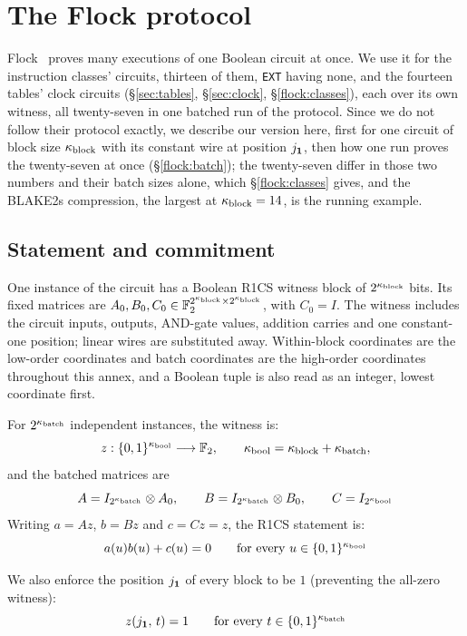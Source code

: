 \section{The Flock protocol}\label{annex:flock}

Flock~\cite{Flock26} proves many executions of one Boolean circuit at once. We use it for the instruction classes' circuits, thirteen of them, \texttt{EXT} having none, and the fourteen tables' clock circuits (\S\ref{sec:tables}, \S\ref{sec:clock}, \S\ref{flock:classes}), each over its own witness, all twenty-seven in one batched run of the protocol. Since we do not follow their protocol exactly, we describe our version here, first for one circuit of block size $\kappa_{\mathrm{block}}$ with its constant wire at position $j_{\mathbf{1}}$, then how one run proves the twenty-seven at once (\S\ref{flock:batch}); the twenty-seven differ in those two numbers and their batch sizes alone, which \S\ref{flock:classes} gives, and the BLAKE2s compression, the largest at $\kappa_{\mathrm{block}}=14$, is the running example.

\subsection{Statement and commitment}\label{flock:statement}

One instance of the circuit has a Boolean R1CS witness block of $2^{\kappa_{\mathrm{block}}}$ bits. Its fixed matrices are $A_0,B_0,C_0\in\mathbb{F}_2^{2^{\kappa_{\mathrm{block}}}\times 2^{\kappa_{\mathrm{block}}}}$, with $C_0=I$. The witness includes the circuit inputs, outputs, AND-gate values, addition carries and one constant-one position; linear wires are substituted away. Within-block coordinates are the low-order coordinates and batch coordinates are the high-order coordinates throughout this annex, and a Boolean tuple is also read as an integer, lowest coordinate first.

For $2^{\kappa_{\mathrm{batch}}}$ independent instances, the witness is:
\[
z:\{0,1\}^{\kappa_{\mathrm{bool}}}\longrightarrow\mathbb{F}_2,\qquad \kappa_{\mathrm{bool}}=\kappa_{\mathrm{block}}+\kappa_{\mathrm{batch}},
\]
and the batched matrices are
\[
A=I_{2^{\kappa_{\mathrm{batch}}}}\otimes A_0,\qquad B=I_{2^{\kappa_{\mathrm{batch}}}}\otimes B_0,\qquad C=I_{2^{\kappa_{\mathrm{bool}}}}
\]
Writing $a=Az$, $b=Bz$ and $c=Cz=z$, the R1CS statement is:
\begin{equation}\label{flock:eq:r1cs}
a(u)b(u)+c(u)=0\qquad\text{for every }u\in\{0,1\}^{\kappa_{\mathrm{bool}}}
\end{equation}

We also enforce the position $j_{\mathbf{1}}$ of every block to be $1$ (preventing the all-zero witness):
\begin{equation}\label{flock:eq:const-one}
z(j_{\mathbf{1}},\,t)=1\qquad\text{for every }t\in\{0,1\}^{\kappa_{\mathrm{batch}}}
\end{equation}

